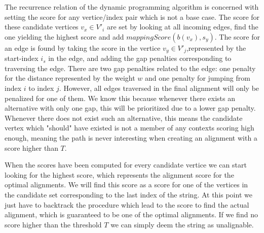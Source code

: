 \documentclass[thesis.tex]{subfiles}
\begin{document}
\par\noindent
The recurrence relation of the dynamic programming algorithm is concerned with setting the score for any vertice/index pair which is not a base case. The score for these candidate vertices $v_x \in V'_i$ are set by looking at all incoming edges, find the one yielding the highest score and add $mappingScore(b(v_x), s_y)$. The score for an edge is found by taking the score in the vertice $v_y \in V'_j$,represented by the start-index $i_s$ in the edge, and adding the gap penalties corresponding to traversing the edge. There are two gap penalties related to the edge: one penalty for the distance represented by the weight $w$ and one penalty for jumping from index $i$ to index $j$. However, all edges traversed in the final alignment will only be penalized for one of them. We know this because whenever there exists an alternative with only one gap, this will be prioritized due to a lower gap penalty. Whenever there does not exist such an alternative, this means the candidate vertex which "should" have existed is not a member of any contexts scoring high enough, meaning the path is never interesting when creating an alignment with a score higher than $T$.\\
\par\noindent
When the scores have been computed for every candidate vertice we can start looking for the highest score, which represents the alignment score for the optimal alignments. We will find this score as a score for one of the vertices in the candidate set corresponding to the last index of the string. At this point we just have to backtrack the procedure which lead to the score to find the actual alignment, which is guaranteed to be one of the optimal alignments. If we find no score higher than the threshold $T$ we can simply deem the string as unalignable.
\end{document}
